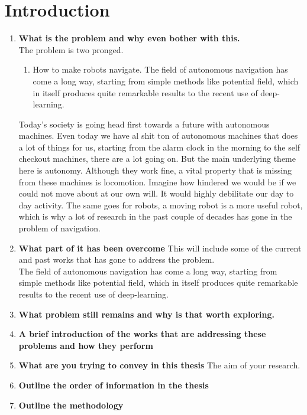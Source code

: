 \part{\rm\bfseries Introduction}
\label{ch:introduction}
\begin{enumerate}
    \item \textbf{What is the problem and why even bother with this.}\\
    The problem is two pronged. 
    \begin{enumerate}
        \item How to make robots navigate.
    The field of autonomous navigation has come a long way, starting from simple methods like potential field, which in itself produces quite remarkable results to the recent use of deep-learning.
    \end{enumerate}
    Today's society is going head first towards a future with autonomous machines. Even today we have al shit ton of autonomous machines that does a lot of things for us, starting from the alarm clock in the morning to the self checkout machines, there are a lot going on. But the main underlying theme here is autonomy. Although they work fine, a vital property that is missing from these machines is locomotion. Imagine how hindered we would be if we could not move about at our own will. It would highly debilitate our day to day activity. The same goes for robots, a moving robot is a more useful robot, which is why a lot of research in the past couple of decades has gone in the problem of navigation.
    \item \textbf{What part of it has been overcome} This will include some of the current and past works that has gone to address the problem.\\
    The field of autonomous navigation has come a long way, starting from simple methods like potential field, which in itself produces quite remarkable results to the recent use of deep-learning.
    \item \textbf{What problem still remains and why is that worth exploring.}
    \item \textbf{A brief introduction of the works that are addressing these problems and how they perform}
    \item \textbf{What are you trying to convey in this thesis} The aim of your research.
    \item \textbf{Outline the order of information in the thesis}
    \item \textbf{Outline the methodology}
\end{enumerate}

